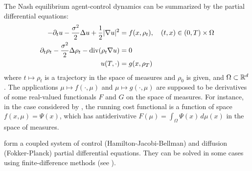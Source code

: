 \documentclass[../report.tex]{subfiles}
\begin{document}
The Nash equilibrium agent-control dynamics can be summarized by the partial differential equations:
\begin{subequations}\label{eq:VariationalQuadraticMFG}
	\begin{align}\label{eq:VarQuadMFGHJB}
	-\partial_t u - \frac{\sigma^2}{2}\Delta u + \frac12|\nabla u|^2 &= f(x, \rho_t), \quad (t,x) \in  (0, T) \times \Omega \\\label{eq:VarQuadMFGKolmo}
	\partial_t \rho_t - \frac{\sigma^2}{2}\Delta\rho_t - \operatorname{div}(\rho_t \nabla u) &= 0 \\
	u(T, \cdot) &= g(x, \rho_T)
	\end{align}
\end{subequations}
where $t\mapsto \rho_t$ is a trajectory in the space of measures and $\rho_0$ is given, and $\Omega\subset\mathbb{R}^d$. The applications $\mu\mapsto f(\cdot, \mu)$ and $\mu\mapsto g(\cdot, \mu)$ are supposed to be derivatives of some real-valued functionals $F$ and $G$ on the space of measures. For instance, in the case considered by \textcite{benamou:hal-01295299}, the running cost functional is a function of space $f(x, \mu) = \Psi(x)$, which has antiderivative $F(\mu) = \int_\Omega \Psi(x) \,d\mu(x)$ in the space of measures.

 form a coupled system of control (Hamilton-Jacobi-Bellman) and diffusion (Fokker-Planck) partial differential equations. They can be solved in some cases using finite-difference methods (see \textcite{achdou:hal-01456506}).
\end{document}
